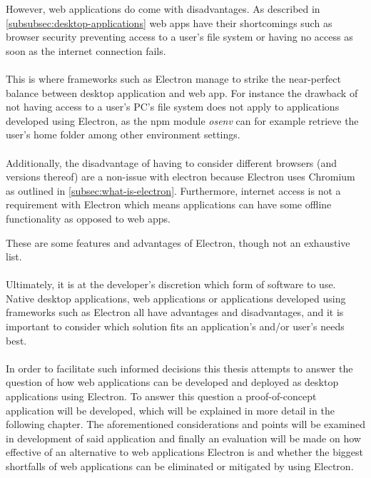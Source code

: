 
However, web applications do come with disadvantages. 
As described in \ref{subsubsec:desktop-applications} web apps have their shortcomings such as 
browser security preventing access to a user's file system or having no access as soon as the internet connection
fails.\paragraph{}
This is where frameworks such as Electron manage to strike the near-perfect balance between desktop application and web app.
For instance the drawback of not having access to a user's PC's file system does not apply to applications 
developed using Electron, as the npm module \emph{osenv} can for example retrieve the user's home folder among 
other environment settings. \parencite{osenv}\paragraph{}
Additionally, the disadvantage of having to consider different browsers (and versions thereof) are a non-issue
with electron because Electron uses Chromium as outlined in \ref{subsec:what-is-electron}. 
Furthermore, internet access is not a requirement with Electron which means applications can have some offline
functionality as opposed to web apps.\par
These are some features and advantages of Electron, though not an exhaustive list. \parencite{electronDocs}\paragraph{}
Ultimately, it is at the developer's discretion which form of software to use.
Native desktop applications, web applications or applications developed using frameworks such as Electron 
all have advantages and disadvantages, and it is important to consider
which solution fits an application's and/or user's needs best.\paragraph{}
In order to facilitate such informed decisions this thesis attempts to answer the question of how web applications can
be developed and deployed as desktop applications using Electron.
To answer this question a proof-of-concept application will be developed, which will be explained in more detail
in the following chapter.
The aforementioned considerations and points will be examined in development of said application and 
finally an evaluation will be made on how effective of an alternative to web applications Electron is 
and whether the biggest shortfalls of web applications can be eliminated or mitigated by 
using Electron.